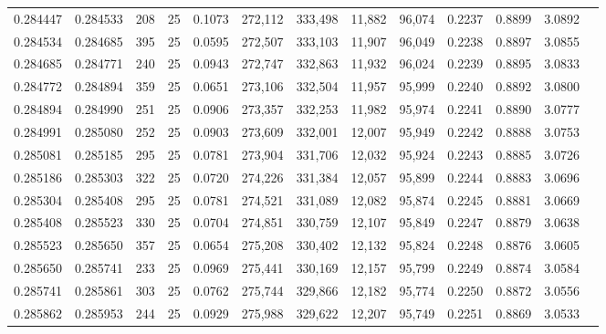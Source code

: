 \begin{tabular}{rrrrrrrrrrrrr}
0.284447 & 0.284533 &   208 &  25 &                                     0.1073 & 272,112 & 333,498 &  11,882 &  96,074 & 0.2237 & 0.8899 & 3.0892 \\
0.284534 & 0.284685 &   395 &  25 &                                     0.0595 & 272,507 & 333,103 &  11,907 &  96,049 & 0.2238 & 0.8897 & 3.0855 \\
0.284685 & 0.284771 &   240 &  25 &                                     0.0943 & 272,747 & 332,863 &  11,932 &  96,024 & 0.2239 & 0.8895 & 3.0833 \\
0.284772 & 0.284894 &   359 &  25 &                                     0.0651 & 273,106 & 332,504 &  11,957 &  95,999 & 0.2240 & 0.8892 & 3.0800 \\
0.284894 & 0.284990 &   251 &  25 &                                     0.0906 & 273,357 & 332,253 &  11,982 &  95,974 & 0.2241 & 0.8890 & 3.0777 \\
0.284991 & 0.285080 &   252 &  25 &                                     0.0903 & 273,609 & 332,001 &  12,007 &  95,949 & 0.2242 & 0.8888 & 3.0753 \\
0.285081 & 0.285185 &   295 &  25 &                                     0.0781 & 273,904 & 331,706 &  12,032 &  95,924 & 0.2243 & 0.8885 & 3.0726 \\
0.285186 & 0.285303 &   322 &  25 &                                     0.0720 & 274,226 & 331,384 &  12,057 &  95,899 & 0.2244 & 0.8883 & 3.0696 \\
0.285304 & 0.285408 &   295 &  25 &                                     0.0781 & 274,521 & 331,089 &  12,082 &  95,874 & 0.2245 & 0.8881 & 3.0669 \\
0.285408 & 0.285523 &   330 &  25 &                                     0.0704 & 274,851 & 330,759 &  12,107 &  95,849 & 0.2247 & 0.8879 & 3.0638 \\
0.285523 & 0.285650 &   357 &  25 &                                     0.0654 & 275,208 & 330,402 &  12,132 &  95,824 & 0.2248 & 0.8876 & 3.0605 \\
0.285650 & 0.285741 &   233 &  25 &                                     0.0969 & 275,441 & 330,169 &  12,157 &  95,799 & 0.2249 & 0.8874 & 3.0584 \\
0.285741 & 0.285861 &   303 &  25 &                                     0.0762 & 275,744 & 329,866 &  12,182 &  95,774 & 0.2250 & 0.8872 & 3.0556 \\
0.285862 & 0.285953 &   244 &  25 &                                     0.0929 & 275,988 & 329,622 &  12,207 &  95,749 & 0.2251 & 0.8869 & 3.0533 \\

\end{tabular}
